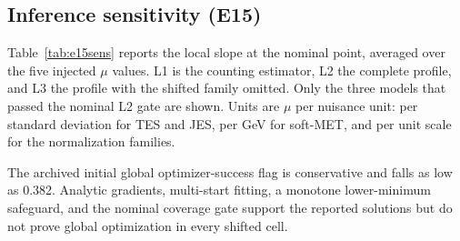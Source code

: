 \documentclass[11pt,a4paper]{article}
\begin{document}
\subsection{Inference sensitivity (E15)}

Table~\ref{tab:e15sens} reports the local slope at the nominal point,
averaged over the five injected $\mu$ values. L1 is the counting
estimator, L2 the complete profile, and L3 the profile with the shifted
family omitted. Only the three models that passed the nominal L2 gate are
shown. Units are $\mu$ per nuisance unit: per standard deviation for TES
and JES, per GeV for soft-MET, and per unit scale for the normalization
families.

The archived initial global optimizer-success flag is conservative and falls
as low as 0.382. Analytic gradients, multi-start fitting, a
monotone lower-minimum safeguard, and the nominal coverage gate support the
reported solutions but do not prove global optimization in every shifted cell.
\end{document}
